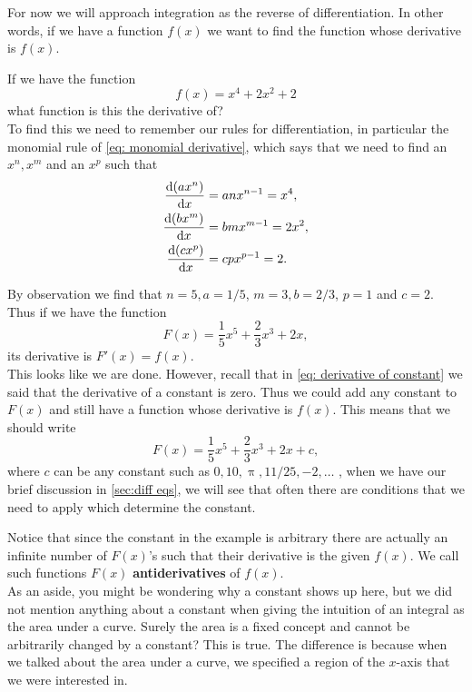 For now we will approach integration as the reverse of differentiation. In other words, if we have a function $f(x)$ we want to find the function whose derivative is $f(x)$.

\begin{ex}
If we have the function
\begin{equation*}
f(x)=x^{4}+2x^{2}+2
\end{equation*}
what function is this the derivative of?\\

To find this we need to remember our rules for differentiation, in particular the monomial rule of \cref{eq: monomial derivative}, which says that  we need to find an $x^{n}, x^{m}$ and an $x^{p}$ such that
\begin{align*}
\frac{\mathrm{d} (ax^{n})}{\mathrm{d} x}&=anx^{n-1}=x^{4},\\
\frac{\mathrm{d} (bx^{m})}{\mathrm{d} x}&=bmx^{m-1}=2x^{2},\\
\frac{\mathrm{d} (cx^{p})}{\mathrm{d} x}&=cpx^{p-1}=2.
\end{align*}

By observation we find that $n=5, a=1/5$, $m=3, b=2/3$, $p=1$ and $c=2$. Thus if we have the function
\begin{equation*}
F(x)=\frac{1}{5}x^{5}+\frac{2}{3}x^{3}+2x,
\end{equation*}
its derivative is $F'(x)=f(x)$.\\

This looks like we are done. However, recall that in \cref{eq: derivative of constant} we said that the derivative of a constant is zero. Thus we could add any constant to $F(x)$ and still have a function whose derivative is $f(x)$. This means that we should write
\begin{equation*}
F(x)=\frac{1}{5}x^{5}+\frac{2}{3}x^{3}+2x+c,
\end{equation*}
where $c$ can be any constant such as $0, 10, \uppi, 11/25, -2, \dots$ , when we have our brief discussion in \cref{sec:diff eqs}, we will see that often there are conditions that we need to apply which determine the constant.  
\end{ex}

Notice that since the constant in the example is arbitrary there are actually an infinite number of $F(x)$'s such that their derivative is the given $f(x)$. We call such functions $F(x)$ \textbf{antiderivatives} of $f(x)$.\\

As an aside, you might be wondering why a constant shows up here, but we did not mention anything about a constant when giving the intuition of an integral as the area under a curve. Surely the area is a fixed concept and cannot be arbitrarily changed by a constant? This is true. The difference is because when we talked about the area under a curve, we specified a region of the $x$-axis that we were interested in.\\

